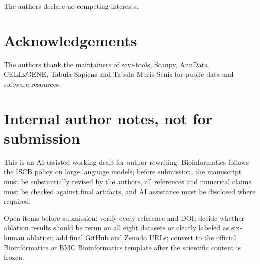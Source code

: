 \documentclass[11pt]{article}
\begin{document}
The authors declare no competing interests.

\section*{Acknowledgements}

The authors thank the maintainers of scvi-tools, Scanpy, AnnData, CELLxGENE,
Tabula Sapiens and Tabula Muris Senis for public data and software resources.

\section*{Internal author notes, not for submission}

This is an AI-assisted working draft for author rewriting. Bioinformatics
follows the ISCB policy on large language models; before submission, the
manuscript must be substantially revised by the authors, all references and
numerical claims must be checked against final artifacts, and AI assistance
must be disclosed where required.

Open items before submission: verify every reference and DOI; decide whether
ablation results should be rerun on all eight datasets or clearly labeled as
six-human ablation; add final GitHub and Zenodo URLs; convert to the official
Bioinformatics or BMC Bioinformatics template after the scientific content is
frozen.
\end{document}
